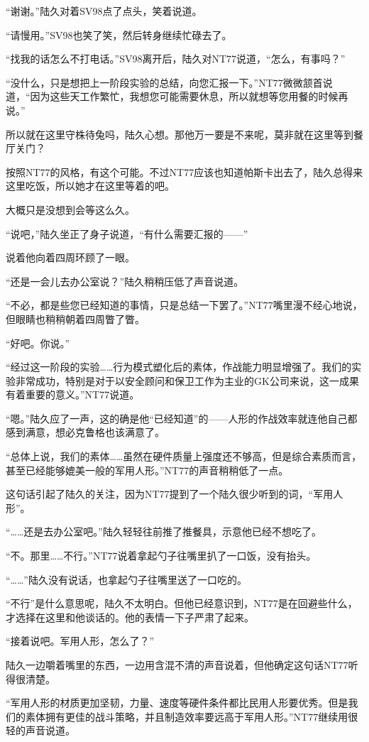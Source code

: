 “谢谢。”陆久对着SV98点了点头，笑着说道。

“请慢用。”SV98也笑了笑，然后转身继续忙碌去了。

“找我的话怎么不打电话。”SV98离开后，陆久对NT77说道，“怎么，有事吗？”

“没什么，只是想把上一阶段实验的总结，向您汇报一下。”NT77微微颔首说道，“因为这些天工作繁忙，我想您可能需要休息，所以就想等您用餐的时候再说。”

所以就在这里守株待兔吗，陆久心想。那他万一要是不来呢，莫非就在这里等到餐厅关门？

按照NT77的风格，有这个可能。不过NT77应该也知道帕斯卡出去了，陆久总得来这里吃饭，所以她才在这里等着的吧。

大概只是没想到会等这么久。

“说吧，”陆久坐正了身子说道，“有什么需要汇报的——”

说着他向着四周环顾了一眼。

“还是一会儿去办公室说？”陆久稍稍压低了声音说道。

“不必，都是些您已经知道的事情，只是总结一下罢了。”NT77嘴里漫不经心地说，但眼睛也稍稍朝着四周瞥了瞥。

“好吧。你说。”

“经过这一阶段的实验……行为模式塑化后的素体，作战能力明显增强了。我们的实验非常成功，特别是对于以安全顾问和保卫工作为主业的GK公司来说，这一成果有着重要的意义。”NT77说道。

“嗯。”陆久应了一声，这的确是他“已经知道”的——人形的作战效率就连他自己都感到满意，想必克鲁格也该满意了。

“总体上说，我们的素体……虽然在硬件质量上强度还不够高，但是综合素质而言，甚至已经能够媲美一般的军用人形。”NT77的声音稍稍低了一点。

这句话引起了陆久的关注，因为NT77提到了一个陆久很少听到的词，“军用人形”。

“……还是去办公室吧。”陆久轻轻往前推了推餐具，示意他已经不想吃了。

“不。那里……不行。”NT77说着拿起勺子往嘴里扒了一口饭，没有抬头。

“……”陆久没有说话，也拿起勺子往嘴里送了一口吃的。

“不行”是什么意思呢，陆久不太明白。但他已经意识到，NT77是在回避些什么，才选择在这里和他谈话的。他的表情一下子严肃了起来。

“接着说吧。军用人形，怎么了？”

陆久一边嚼着嘴里的东西，一边用含混不清的声音说着，但他确定这句话NT77听得很清楚。

“军用人形的材质更加坚韧，力量、速度等硬件条件都比民用人形要优秀。但是我们的素体拥有更佳的战斗策略，并且制造效率要远高于军用人形。”NT77继续用很轻的声音说道。


